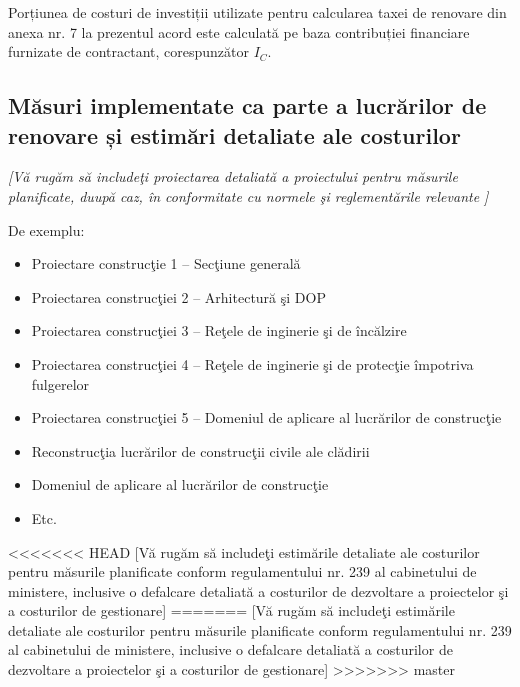 \vspace{1cm}

Porțiunea de costuri de investiții utilizate pentru calcularea taxei de renovare din anexa nr. 7 la prezentul acord este calculată pe baza contribuției financiare furnizate de contractant, corespunzător $I_C$.

\subsection{Măsuri implementate ca parte a lucrărilor de renovare și estimări detaliate ale costurilor}

	\textit{[Vă rugăm să includeţi proiectarea detaliată a proiectului pentru măsurile planificate, duupă caz, în conformitate cu normele şi reglementările relevante ]}

        De exemplu:
        \begin{itemize}
		\item Proiectare construcţie  1 – Secţiune generală
		\item Proiectarea construcţiei  2 – Arhitectură şi DOP
		\item Proiectarea construcţiei  3 –  Reţele de inginerie şi de încălzire
		\item Proiectarea construcţiei  4 – Reţele de inginerie şi de protecţie împotriva fulgerelor
		\item Proiectarea construcţiei  5 – Domeniul de aplicare al lucrărilor de construcţie
		\item Reconstrucţia lucrărilor de construcţii civile ale clădirii
		\item Domeniul de aplicare al lucrărilor de construcţie
		\item Etc.
	\end{itemize}

<<<<<<< HEAD
[Vă rugăm să includeţi estimările detaliate ale costurilor pentru măsurile planificate conform regulamentului nr. 239 al cabinetului de ministere, inclusive o defalcare detaliată a costurilor de dezvoltare a proiectelor şi a costurilor de gestionare]
=======
[Vă rugăm să includeţi estimările detaliate ale costurilor pentru măsurile planificate conform regulamentului nr. 239 al cabinetului de ministere, inclusive o defalcare detaliată a costurilor de dezvoltare a proiectelor şi a costurilor de gestionare]
>>>>>>> master
